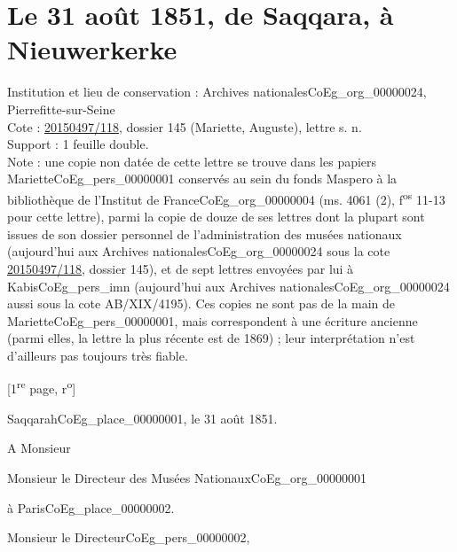 \documentclass{book}
\begin{document}
\section*{Le 31 août 1851, de Saqqara, à Nieuwerkerke} \label{CoEg_Mariette_1851-08-31} 
{\footnotesize
\noindent Institution et lieu de conservation : Archives nationales\gls{CoEg_org_00000024}, Pierrefitte-sur-Seine\\
Cote : \hyperref[CoEg_Mariette_ms_001]{20150497/118}, dossier 145 (Mariette, Auguste), lettre s. n.\\
Support : 1 feuille double.\\
Note : une copie non datée de cette lettre se trouve dans les papiers Mariette\gls{CoEg_pers_00000001} conservés au sein du fonds Maspero à la bibliothèque de l'Institut de France\gls{CoEg_org_00000004} (ms. 4061 (2), f\textsuperscript{os} 11-13 pour cette lettre), parmi la copie de douze de ses lettres dont la plupart sont issues de son dossier personnel de l'administration des musées nationaux (aujourd'hui aux Archives nationales\gls{CoEg_org_00000024} sous la cote \hyperref[CoEg_Mariette_ms_001]{20150497/118}, dossier 145), et de sept lettres envoyées par lui à Kabis\gls{CoEg_pers_imn} (aujourd'hui aux Archives nationales\gls{CoEg_org_00000024} aussi sous la cote AB/XIX/4195). Ces copies ne sont pas de la main de Mariette\gls{CoEg_pers_00000001}, mais correspondent à une écriture ancienne (parmi elles, la lettre la plus récente est de 1869) ; leur interprétation n'est d'ailleurs pas toujours très fiable.
\begin{center} {[1\textsuperscript{re} page, r\textsuperscript{o}]}\end{center}}
\begin{flushright}Saqqarah\gls{CoEg_place_00000001}, le 31 août 1851.\end{flushright}
A Monsieur
\begin{center}Monsieur le Directeur des Musées Nationaux\gls{CoEg_org_00000001}\end{center}
\begin{flushright}à Paris\gls{CoEg_place_00000002}.\end{flushright}

\indent \hspace{1cm}Monsieur le Directeur\gls{CoEg_pers_00000002},\\
\end{document}
